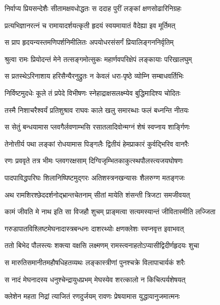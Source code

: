 \twolineshloka
{निर्वाप्य प्रियसन्देशैः सीतामक्षवधोद्धतः}
{स ददाह पुरीं लङ्कां क्षणसोढारिनिग्रहः} %

\twolineshloka
{प्रत्यभिज्ञानरत्नं च रामायादर्शयत्कृती}
{हृदयं स्वयमायातं वैदेह्या इव मूर्तिमत्} %

\twolineshloka
{स प्राप हृदयन्यस्तमणिपर्शनिमीलितः}
{अपयोधरसंसर्गं प्रियालिङ्गननिर्वृतिम्} %

\twolineshloka
{श्रुत्वा रामः प्रियोदन्तं मेने तत्सङ्गमोत्सुकः}
{महार्णवपरिक्षेपं लङ्कायाः परिखालघुम्} %

\twolineshloka
{स प्रतस्थेऽरिनाशाय हरिसैन्यैरनुद्रुतः}
{न केवलं धरा-पृष्ठे व्योम्नि सम्बाधवर्तिभिः} %

\twolineshloka
{निर्विष्टमुदधेः कूले तं प्रपेदे विभीषणः}
{स्नेहाद्राक्षसलक्ष्म्येव बुद्धिमादिश्य चोदितः} %

\twolineshloka
{तस्मै निशाचरैश्वर्यं प्रतिशुश्राव राघवः}
{काले खलु समारब्धाः फलं बध्नन्ति नीतयः} %

\twolineshloka
{स सेतुं बन्धयामास प्लवगैर्लवणाम्भसि}
{रसातलादिवोन्मग्नं शेषं स्वप्नाय शार्ङ्गिणः} %

\twolineshloka
{तेनोत्तीर्य पथा लङ्कां रोधयामास पिङ्गलैः}
{द्वितीयं हेमप्राकारं कुर्वद्भिरिव वानरैः} %

\twolineshloka
{रणः प्रववृते तत्र भीमः प्लवगरक्षसाम्}
{दिग्विजृम्भितकाकुत्स्थपौलस्त्यजयघोषणः} %

\twolineshloka
{पादपाविद्धपरिघः शिलानिष्पिष्टमुद्गरः}
{अतिशस्त्रनखन्यासः शैलरुग्ण मतङ्गजः} %

\twolineshloka
{अथ रामशिरश्छेददर्शनोद्भ्रान्तचेतनाम्}
{सीतां मायेति शंसन्ती त्रिजटा समजीवयत्} %

\twolineshloka
{कामं जीवति मे नाथ इति सा विजहौ शुचम्}
{प्राङ्मत्वा सत्यमस्यान्तं जीवितास्मीति लज्जिता} %

\twolineshloka
{गरुडापातविश्लिष्टमेघनादास्त्रबन्धनः}
{दाशरथ्योः क्षणक्लेशः स्वप्नवृत्त इवाभवत्} %

\twolineshloka
{ततो बिभेद पौलस्त्यः शक्त्या वक्षसि लक्ष्मणम्}
{रामस्त्वनाहतोऽप्यासीद्विदीर्णहृदयः शुचा} %

\twolineshloka
{स मारुतिसमानीतमहौषधिहतव्यथः}
{लङ्कास्त्रीणां पुनश्चक्रे विलापाचार्यकं शरैः} %

\twolineshloka
{स नादं मेघनादस्य धनुश्चेन्द्रायुधप्रभम्}
{मेघस्येव शरत्कालो न किचित्पर्यशेषयत्} %

\twolineshloka
{क्लेशेन महता निद्रां त्याजितं रणदुर्जयम्}
{रावणः प्रेषयामास युद्धायानुजमात्मनः} %


